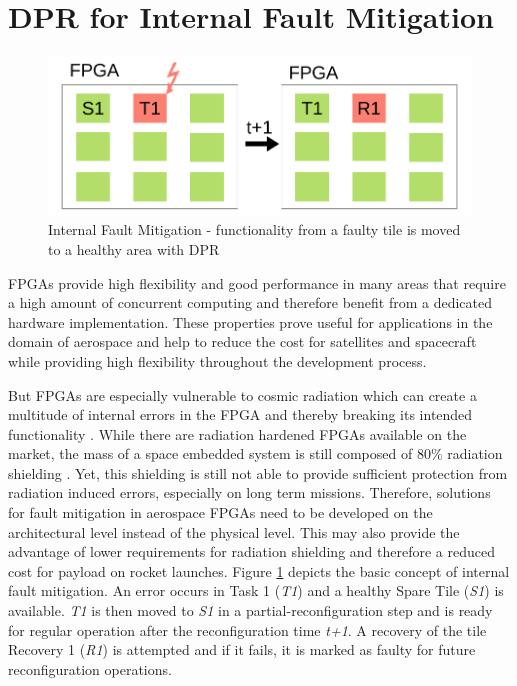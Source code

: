 \section{\gls{DPR} for Internal Fault Mitigation}\label{InternalFaults}
\begin{figure}
    \centering
    \includegraphics[width=\columnwidth]{graphics/faultyTile2.pdf}
    \caption{Internal Fault Mitigation - functionality from a faulty tile is moved to a healthy area with \gls{DPR}}\label{fig:internalFaultMitigation}
\end{figure}

%
\glspl{FPGA} provide high flexibility and good performance in many areas that require a high amount of concurrent computing and therefore benefit from a dedicated hardware implementation.
These properties prove useful for applications in the domain of aerospace and help to reduce the cost for satellites and spacecraft while providing high flexibility throughout the development process. 

But \glspl{FPGA} are especially vulnerable to cosmic radiation which can create a multitude of internal errors in the \gls{FPGA} and thereby breaking its intended functionality \cite{ito_total_2015}.
While there are radiation hardened \glspl{FPGA} available on the market, the mass of a space embedded system is still composed of 80\% radiation shielding \cite{ito_total_2015}.
Yet, this shielding is still not able to provide sufficient protection from radiation induced errors, especially on long term missions. 
Therefore, solutions for fault mitigation in aerospace \glspl{FPGA} need to be developed on the architectural level instead of the physical level. 
This may also provide the advantage of lower requirements for radiation shielding and therefore a reduced cost for payload on rocket launches.
Figure \ref{fig:internalFaultMitigation} depicts the basic concept of internal fault mitigation. 
An error occurs in Task 1 (\textit{T1}) and a healthy Spare Tile (\textit{S1}) is available. 
\textit{T1} is then moved to \textit{S1} in a partial-reconfiguration step and is ready for regular operation after the reconfiguration time \textit{t+1}.
A recovery of the tile Recovery 1 (\textit{R1}) is attempted and if it fails, it is marked as faulty for future reconfiguration operations.

